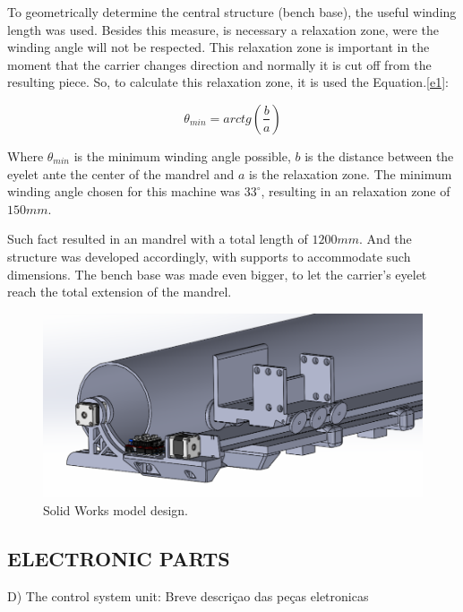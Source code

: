 \documentclass[10pt,fleqn,a4paper,twoside]{article}
\begin{document}
To geometrically determine the central structure (bench base), the useful winding length was used. Besides this measure, is necessary a relaxation zone, were the winding angle will not be respected. This relaxation zone is important in the moment that the carrier changes direction \citep{livro_prof} and normally it is cut off from the resulting piece. So, to calculate this relaxation zone, it is used the Equation.\ref{e1}:

\begin{equation}\label{e1}
\theta_{min} = arctg \left(\frac{b}{a}\right)
\end{equation}

Where $\theta_{min}$ is the minimum winding angle possible, $b$ is the distance between the eyelet ante the center of the mandrel and $a$ is the relaxation zone. The minimum winding angle chosen for this machine was $33^\circ$, resulting in an relaxation zone of $150 mm$.

Such fact resulted in an mandrel with a total length of $1200mm$. And the structure was developed accordingly, with supports to accommodate such dimensions. The bench base was made even bigger, to let the carrier's eyelet reach the total extension of the mandrel.  



\begin{figure}[!h]
\centering
\includegraphics[angle=0, trim = {0mm 0mm 30mm 10mm}, clip , scale=0.3]{imagens/cad}
\caption{Solid Works model design.}
\label{i5}
\end{figure}




\subsection{ELECTRONIC PARTS}

D) The control system unit:
Breve descriçao das peças eletronicas
\end{document}
